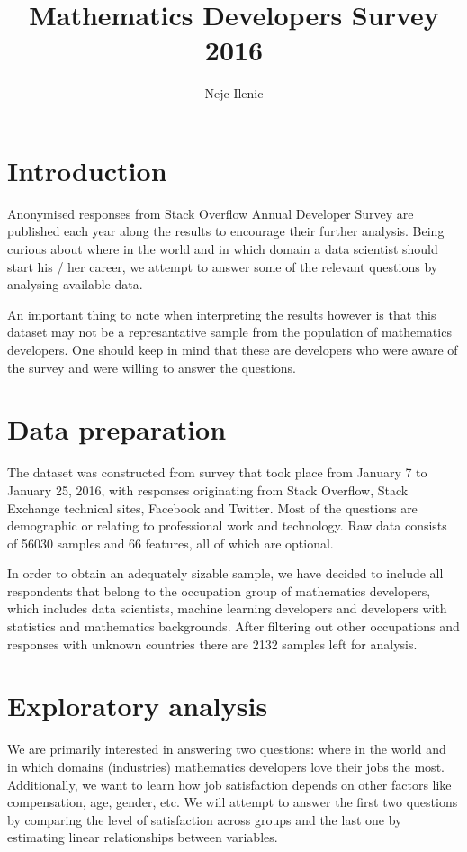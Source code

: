 \documentclass{article}
\begin{document}





\title{Mathematics Developers Survey 2016}
\author{Nejc Ilenic}
\date{}
\maketitle

\section{Introduction}
Anonymised responses from Stack Overflow Annual Developer Survey are published each year along the results to encourage their further analysis. Being curious about where in the world and in which domain a data scientist should start his / her career, we attempt to answer some of the relevant questions by analysing available data.

\vspace{2mm}

An important thing to note when interpreting the results however is that this dataset may not be a represantative sample from the population of mathematics developers. One should keep in mind that these are developers who were aware of the survey and were willing to answer the questions.

\section{Data preparation}
The dataset was constructed from survey that took place from January 7 to January 25, 2016, with responses originating from Stack Overflow, Stack Exchange technical sites, Facebook and Twitter. Most of the questions are demographic or relating to professional work and technology. Raw data consists of 56030 samples and 66 features, all of which are optional.

In order to obtain an adequately sizable sample, we have decided to include all respondents that belong to the occupation group of mathematics developers, which includes data scientists, machine learning developers and developers with statistics and mathematics backgrounds. After filtering out other occupations and responses with unknown countries there are 2132 samples left for analysis.

\section{Exploratory analysis}
We are primarily interested in answering two questions: where in the world and in which domains (industries) mathematics developers love their jobs the most. Additionally, we want to learn how job satisfaction depends on other factors like compensation, age, gender, etc. We will attempt to answer the first two questions by comparing the level of satisfaction across groups and the last one by estimating linear relationships between variables.
\end{document}
